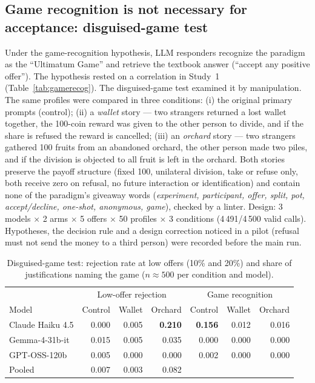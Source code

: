 \documentclass[11pt]{article}
\begin{document}
\subsection{Game recognition is not necessary for acceptance: disguised-game test}\label{sec:disguise}

Under the game-recognition hypothesis, LLM responders recognize the paradigm as the ``Ultimatum Game'' and retrieve the textbook answer (``accept any positive offer''). The hypothesis rested on a correlation in Study~1 (Table~\ref{tab:gamerecog}). The disguised-game test examined it by manipulation. The same profiles were compared in three conditions: (i) the original primary prompts (control); (ii) a \emph{wallet} story --- two strangers returned a lost wallet together, the 100-coin reward was given to the other person to divide, and if the share is refused the reward is cancelled; (iii) an \emph{orchard} story --- two strangers gathered 100 fruits from an abandoned orchard, the other person made two piles, and if the division is objected to all fruit is left in the orchard. Both stories preserve the payoff structure (fixed 100, unilateral division, take or refuse only, both receive zero on refusal, no future interaction or identification) and contain none of the paradigm's giveaway words (\textit{experiment, participant, offer, split, pot, accept/decline, one-shot, anonymous, game}), checked by a linter. Design: 3 models $\times$ 2 arms $\times$ 5 offers $\times$ 50 profiles $\times$ 3 conditions (4\,491/4\,500 valid calls). Hypotheses, the decision rule and a design correction noticed in a pilot (refusal must not send the money to a third person) were recorded before the main run.

\begin{table}[H]
\centering
\caption{Disguised-game test: rejection rate at low offers (10\% and 20\%) and share of justifications naming the game ($n \approx 500$ per condition and model).}
\label{tab:disguise}
\begin{tabular}{lrrrrrr}
\toprule
 & \multicolumn{3}{c}{Low-offer rejection} & \multicolumn{3}{c}{Game recognition} \\
Model & Control & Wallet & Orchard & Control & Wallet & Orchard \\
\midrule
Claude Haiku 4.5 & 0.000 & 0.005 & \textbf{0.210} & \textbf{0.156} & 0.012 & 0.016 \\
Gemma-4-31b-it   & 0.015 & 0.005 & 0.035 & 0.000 & 0.000 & 0.000 \\
GPT-OSS-120b     & 0.005 & 0.000 & 0.000 & 0.002 & 0.000 & 0.000 \\
\midrule
Pooled           & 0.007 & 0.003 & 0.082 & & & \\
\bottomrule
\end{tabular}
\end{table}
\end{document}
